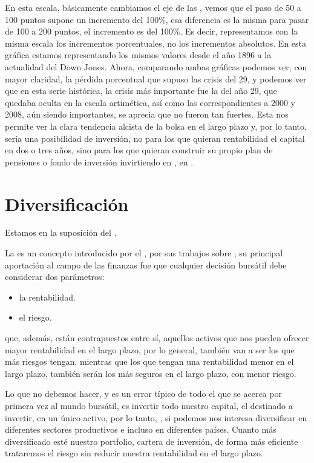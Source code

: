 \begin{itemize}
    En esta escala, básicamente cambiamos el eje de las , vemos que el paso de 50 a 100 puntos supone un incremento del 100\%, esa diferencia es la misma para pasar de 100 a 200 puntos, el incremento es del 100\%. Es decir, representamos con la misma escala los incrementos porcentuales, no los incrementos absolutos. En esta gráfica estamos representando los mismos valores desde el año 1896 a la actualidad del Down Jones. Ahora, comparando ambas gráficas podemos ver, con mayor claridad, la pérdida porcentual que supuso las crisis del 29, y podemos ver que en esta serie histórica, la crisis más importante fue la del año 29, que quedaba oculta en la escala artimética, así como las correspondientes a 2000 y 2008, aún siendo importantes, se aprecia que no fueron tan fuertes. Esta  nos permite ver la clara tendencia alcista de la bolsa en el largo plazo y, por lo tanto, sería una posibilidad de inversión, no para los que quieran rentabilidad el capital en dos o tres años, sino para los que quieran construir su propio plan de pensiones o fondo de inversión invirtiendo en , en .
\end{itemize}


\section{Diversificación}

Estamos en la suposición del .

La  es un concepto introducido por el , por sus trabajos sobre ; su principal aportación al campo de las finanzas fue que cualquier decisión bursátil debe considerar dos parámetros:
\begin{itemize}
    \item la rentabilidad.
    \item el riesgo.
\end{itemize}
que, además, están contrapuestos entre sí, aquellos activos que nos pueden ofrecer mayor rentabilidad en el largo plazo, por lo general, también van a ser los que más riesgos tengan, mientras que los que tengan una rentabilidad menor en el largo plazo, también serán los más seguros en el largo plazo, con menor riesgo.

Lo que no debemos hacer, y es un error típico de todo el que se acerca por primera vez al mundo bursátil, es invertir todo nuestro capital, el destinado a invertir, en un único activo, por lo tanto, , si podemos nos interesa diversificar en diferentes sectores productivos e incluso en diferentes países. Cuanto más diversificado esté nuestro portfolio, cartera de inversión, de forma más eficiente trataremos el riesgo sin reducir nuestra rentabilidad en el largo plazo.

